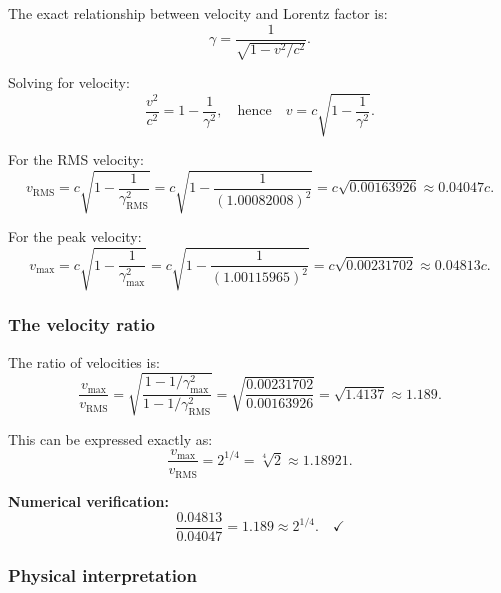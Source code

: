 \documentclass[12pt,letterpaper]{article}
\begin{document}
The exact relationship between velocity and Lorentz factor is:
\begin{equation}
\gamma = \frac{1}{\sqrt{1 - v^2/c^2}}.
\end{equation}

Solving for velocity:
\begin{equation}
\frac{v^2}{c^2} = 1 - \frac{1}{\gamma^2}, \quad \text{hence} \quad v = c\sqrt{1 - \frac{1}{\gamma^2}}.
\end{equation}

For the RMS velocity:
\begin{equation}
v_{\mathrm{RMS}} = c\sqrt{1 - \frac{1}{\gamma_{\mathrm{RMS}}^2}} = c\sqrt{1 - \frac{1}{(1.00082008)^2}} = c\sqrt{0.00163926} \approx 0.04047c.
\end{equation}

For the peak velocity:
\begin{equation}
v_{\max} = c\sqrt{1 - \frac{1}{\gamma_{\max}^2}} = c\sqrt{1 - \frac{1}{(1.00115965)^2}} = c\sqrt{0.00231702} \approx 0.04813c.
\end{equation}

\subsubsection{The velocity ratio}

The ratio of velocities is:
\begin{equation}
\frac{v_{\max}}{v_{\mathrm{RMS}}} = \sqrt{\frac{1 - 1/\gamma_{\max}^2}{1 - 1/\gamma_{\mathrm{RMS}}^2}} = \sqrt{\frac{0.00231702}{0.00163926}} = \sqrt{1.4137} \approx 1.189.
\end{equation}

This can be expressed exactly as:
\begin{equation}
\frac{v_{\max}}{v_{\mathrm{RMS}}} = 2^{1/4} = \sqrt[4]{2} \approx 1.18921.
\end{equation}

\textbf{Numerical verification:}
\begin{equation}
\frac{0.04813}{0.04047} = 1.189 \approx 2^{1/4}. \quad \checkmark
\end{equation}

\subsubsection{Physical interpretation}
\end{document}
